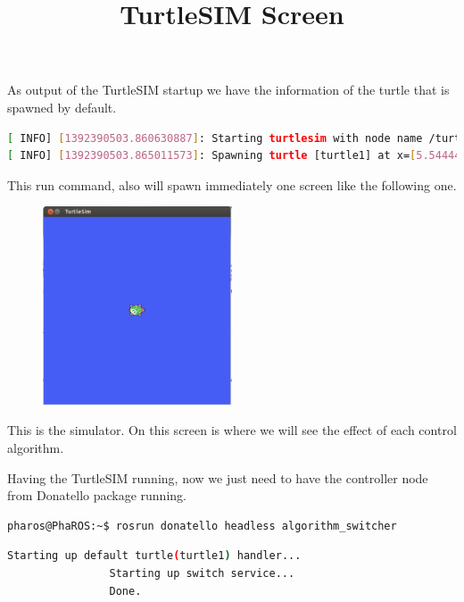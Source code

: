 \documentclass[a4paper,10pt,twoside]{book}
\begin{document}
				As output of the TurtleSIM startup we have the information of the turtle that is spawned by default.
			
			\begin{lstlisting}[language=bash,title={Starting up TurtleSIM - Output}]
[ INFO] [1392390503.860630887]: Starting turtlesim with node name /turtlesim
[ INFO] [1392390503.865011573]: Spawning turtle [turtle1] at x=[5.544445], y=[5.544445], theta=[0.000000]
			\end{lstlisting}
			
				This run command, also will spawn immediately one screen like the following one. 
			
			\begin{figure}[!htbp]
  		
  				\centering
    				\includegraphics[width=0.5\textwidth]{TurtleSIM.png}
				
				\centering
				\title{TurtleSIM Screen}
			\end{figure}
			
				This is the simulator. On this screen is where we will see the effect of each control algorithm.
				
				
			
				Having the TurtleSIM running, now we just need to have the controller node from Donatello package running. 
				
			
			\begin{lstlisting}[language=bash,title={Starting up Donatello/AlgorithmSwitcher}]
				pharos@PhaROS:~$ rosrun donatello headless algorithm_switcher
			\end{lstlisting}
			
			\begin{lstlisting}[language=bash,title={Starting up Donatello/AlgorithmSwitcher - Output }]
				Starting up default turtle(turtle1) handler... 
				Starting up switch service... 
				Done.
			\end{lstlisting}
			
\end{document}
